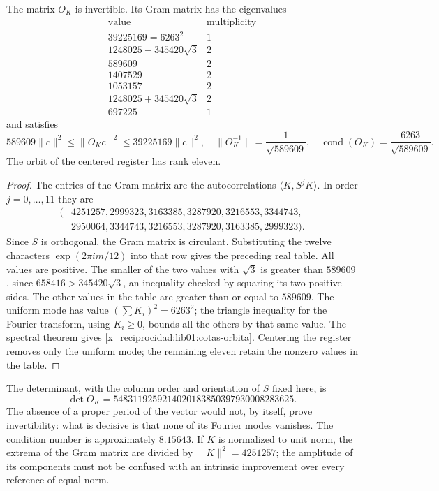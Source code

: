 \begin{theorem}
\label{x_reciprocidad:lib01:marco-ciclico}
The matrix \(O_K\) is invertible. Its Gram matrix has the eigenvalues
\[
\begin{array}{c|c}
 \text{value}&\text{multiplicity}\\\hline
 39225169=6263^2&1\\
 1248025-345420\sqrt3&2\\
 589609&2\\
 1407529&2\\
 1053157&2\\
 1248025+345420\sqrt3&2\\
 697225&1
\end{array}
\]
and satisfies
\begin{equation}
 589609\|c\|^2\leq\|O_Kc\|^2\leq39225169\|c\|^2,
 \quad
 \|O_K^{-1}\|=\frac1{\sqrt{589609}},\quad
 \operatorname{cond}(O_K)=\frac{6263}{\sqrt{589609}}.
 \label{x_reciprocidad:lib01:cotas-orbita}
\end{equation}
The orbit of the centered register has rank eleven.
\end{theorem}
\begin{proof}
The entries of the Gram matrix are the autocorrelations
\(\langle K,S^jK\rangle\). In order \(j=0,\ldots,11\) they are
\begin{align*}
 (&4251257,2999323,3163385,3287920,3216553,3344743,\\
  &2950064,3344743,3216553,3287920,3163385,2999323).
\end{align*}
Since \(S\) is orthogonal, the Gram matrix is circulant. Substituting the twelve
characters \(\exp(2\pi i m/12)\) into that row gives the preceding real
table. All values are positive. The smaller of the two values
with \(\sqrt3\) is greater than \(589609\), since
\(658416>345420\sqrt3\), an inequality checked by squaring its
two positive sides. The other values in the table are
greater than or equal to \(589609\). The uniform mode has value
\((\sum K_i)^2=6263^2\); the triangle inequality for the Fourier
transform, using \(K_i\geq0\), bounds all the others by that same
value. The spectral theorem gives \eqref{x_reciprocidad:lib01:cotas-orbita}. Centering
the register removes only the uniform mode; the remaining eleven retain
the nonzero values in the table.
\end{proof}

The determinant, with the column order and orientation of \(S\)
fixed here, is
\[
 \det O_K=5483119259214020183850397930008283625.
\]
The absence of a proper period of the vector would not, by itself, prove
invertibility: what is decisive is that none of its Fourier modes
vanishes. The condition number is approximately \(8.15643\). If
\(K\) is normalized to unit norm, the extrema of the Gram matrix are divided by
\(\|K\|^2=4251257\); the amplitude of its components must not
be confused with an intrinsic improvement over every reference of equal
norm.

